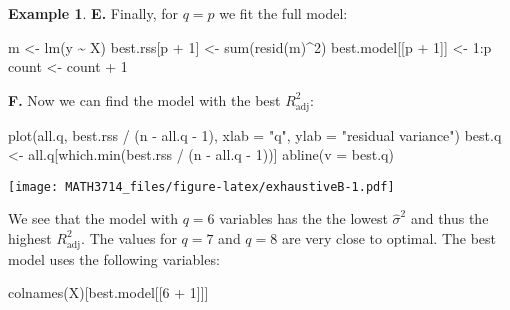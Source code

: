 \documentclass[
  a4paper,
]{article}
\newenvironment{Shaded}{\begin{snugshade}}{\end{snugshade}}
\newcommand{\AttributeTok}[1]{\textcolor[rgb]{0.77,0.63,0.00}{#1}}
\newcommand{\DecValTok}[1]{\textcolor[rgb]{0.00,0.00,0.81}{#1}}
\newcommand{\FunctionTok}[1]{\textcolor[rgb]{0.00,0.00,0.00}{#1}}
\newcommand{\NormalTok}[1]{#1}
\newcommand{\OtherTok}[1]{\textcolor[rgb]{0.56,0.35,0.01}{#1}}
\newcommand{\SpecialCharTok}[1]{\textcolor[rgb]{0.00,0.00,0.00}{#1}}
\newcommand{\StringTok}[1]{\textcolor[rgb]{0.31,0.60,0.02}{#1}}
\theoremstyle{definition}
\theoremstyle{definition}
\newtheorem{example}{Example}[section]
\theoremstyle{definition}
\theoremstyle{definition}
\theoremstyle{remark}
\begin{document}
\begin{example}
\textbf{E.} Finally, for \(q = p\) we fit the full model:

\begin{Shaded}
\begin{Highlighting}[]
\NormalTok{m }\OtherTok{\textless{}{-}} \FunctionTok{lm}\NormalTok{(y }\SpecialCharTok{\textasciitilde{}}\NormalTok{ X)}
\NormalTok{best.rss[p }\SpecialCharTok{+} \DecValTok{1}\NormalTok{] }\OtherTok{\textless{}{-}} \FunctionTok{sum}\NormalTok{(}\FunctionTok{resid}\NormalTok{(m)}\SpecialCharTok{\^{}}\DecValTok{2}\NormalTok{)}
\NormalTok{best.model[[p }\SpecialCharTok{+} \DecValTok{1}\NormalTok{]] }\OtherTok{\textless{}{-}} \DecValTok{1}\SpecialCharTok{:}\NormalTok{p}
\NormalTok{count }\OtherTok{\textless{}{-}}\NormalTok{ count }\SpecialCharTok{+} \DecValTok{1}
\end{Highlighting}
\end{Shaded}

\textbf{F.} Now we can find the model with the best \(R^2_\mathrm{adj}\):

\begin{Shaded}
\begin{Highlighting}[]
\FunctionTok{plot}\NormalTok{(all.q, best.rss }\SpecialCharTok{/}\NormalTok{ (n }\SpecialCharTok{{-}}\NormalTok{ all.q }\SpecialCharTok{{-}} \DecValTok{1}\NormalTok{),}
     \AttributeTok{xlab =} \StringTok{"q"}\NormalTok{, }\AttributeTok{ylab =} \StringTok{"residual variance"}\NormalTok{)}
\NormalTok{best.q }\OtherTok{\textless{}{-}}\NormalTok{ all.q[}\FunctionTok{which.min}\NormalTok{(best.rss }\SpecialCharTok{/}\NormalTok{ (n }\SpecialCharTok{{-}}\NormalTok{ all.q }\SpecialCharTok{{-}} \DecValTok{1}\NormalTok{))]}
\FunctionTok{abline}\NormalTok{(}\AttributeTok{v =}\NormalTok{ best.q)}
\end{Highlighting}
\end{Shaded}

\texttt{[image: MATH3714\_files/figure-latex/exhaustiveB-1.pdf]}

We see that the model with \(q = 6\) variables has the the
lowest \(\hat\sigma^2\) and thus the highest \(R^2_\mathrm{adj}\).
The values for \(q = 7\) and \(q = 8\) are very close to
optimal. The best model uses the following variables:

\begin{Shaded}
\begin{Highlighting}[]
\FunctionTok{colnames}\NormalTok{(X)[best.model[[}\DecValTok{6} \SpecialCharTok{+} \DecValTok{1}\NormalTok{]]]}
\end{Highlighting}
\end{Shaded}


\end{example}
\end{document}
